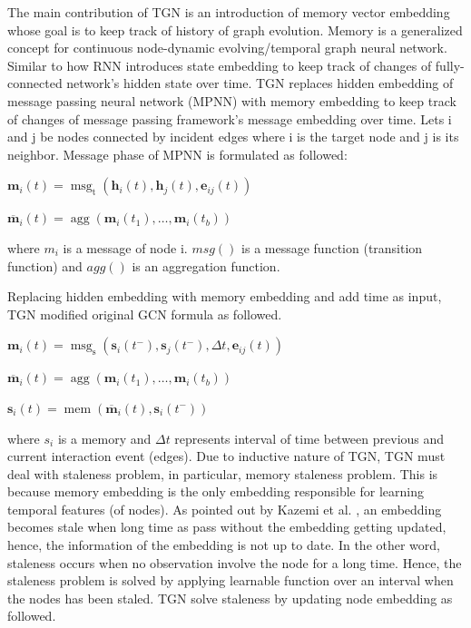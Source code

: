 \documentclass{IEEEtran}
\begin{document}
The main contribution of TGN is an introduction of memory vector embedding whose goal is to keep track of history of graph evolution. Memory is a generalized concept for continuous node-dynamic evolving/temporal graph neural network. Similar to how RNN introduces state embedding to keep track of changes of fully-connected network's hidden state over time. TGN replaces hidden embedding of message passing neural network (MPNN) with memory embedding to keep track of changes of message passing framework's message embedding over time. Lets i and j be nodes connected by incident edges where i is the target node and j is its neighbor. Message phase of MPNN \cite{gilmer2017neural} is formulated as followed:

\(\mathbf{m}_{i}(t)=\operatorname{msg}_{\mathrm{t}}\left(\mathbf{h}_{i}\left(t\right), \mathbf{h}_{j}\left(t\right), \mathbf{e}_{i j}(t)\right)\)

\(\overline{\mathbf{m}}_{i}(t)=\operatorname{agg}\left(\mathbf{m}_{i}\left(t_{1}\right), \ldots, \mathbf{m}_{i}\left(t_{b}\right)\right)\)

where \(m_{i}\) is a message of node i. \(msg()\) is a message function (transition function) and \(agg()\) is an aggregation function.

Replacing hidden embedding with memory embedding and add time as input, TGN modified original GCN formula as followed.

\(\mathbf{m}_{i}(t)=\operatorname{msg}_{\mathrm{s}}\left(\mathbf{s}_{i}\left(t^{-}\right), \mathbf{s}_{j}\left(t^{-}\right), \Delta t, \mathbf{e}_{i j}(t)\right)\)

\(\overline{\mathbf{m}}_{i}(t)=\operatorname{agg}\left(\mathbf{m}_{i}\left(t_{1}\right), \ldots, \mathbf{m}_{i}\left(t_{b}\right)\right)\)

\(\mathbf{s}_{i}(t)=\operatorname{mem}\left(\overline{\mathbf{m}}_{i}(t), \mathbf{s}_{i}\left(t^{-}\right)\right)\)

where \(s_{i}\) is a memory and \(\Delta{t}\) represents interval of time between previous and current interaction event (edges).
Due to inductive nature of TGN, TGN must deal with staleness problem, in particular, memory staleness problem. This is because memory embedding is the only embedding responsible for learning temporal features (of nodes). As pointed out by Kazemi et al. \cite{kazemiRepresentationLearningDynamica}, an embedding becomes stale when long time as pass without the embedding getting updated, hence, the information of the embedding is not up to date. In the other word, staleness occurs when no observation involve the node for a long time. Hence, the staleness problem is solved by applying learnable function over an interval when the nodes has been staled. TGN solve staleness by updating node embedding as followed.
\end{document}
